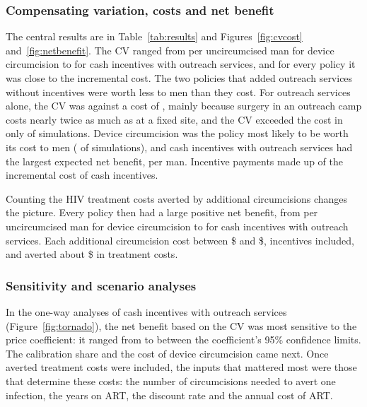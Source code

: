 \documentclass[11pt]{article}
\numberwithin{equation}{section}\numberwithin{figure}{section}\numberwithin{table}{section}
\begin{document}
\begin{table}[!htbp]
\centering
\caption{Predicted choice probabilities and uptake of MMC, by policy (conditional logit).}\label{tab:shares}
\small
{}
\end{table}

\subsubsection{Compensating variation, costs and net benefit}
The central results are in Table~\ref{tab:results} and Figures~\ref{fig:cvcost} and~\ref{fig:netbenefit}. The CV ranged from \mmcPTwoCV{} per uncircumcised man for device circumcision to \mmcPFiveCV{} for cash incentives with outreach services, and for every policy it was close to the incremental cost. The two policies that added outreach services without incentives were worth less to men than they cost. For outreach services alone, the CV was \mmcPOneCV{} against a cost of \mmcPOneCost, mainly because surgery in an outreach camp costs nearly twice as much as at a fixed site, and the CV exceeded the cost in only \mmcPOneNBcvP{} of simulations. Device circumcision was the policy most likely to be worth its cost to men (\mmcPTwoNBcvP{} of simulations), and cash incentives with outreach services had the largest expected net benefit, \mmcPFiveNBcv{} per man. Incentive payments made up \mmcPFourTransfers{} of the \mmcPFourCost{} incremental cost of cash incentives.

Counting the HIV treatment costs averted by additional circumcisions changes the picture. Every policy then had a large positive net benefit, from \mmcPTwoNBtotal{} per uncircumcised man for device circumcision to \mmcPFiveNBtotal{} for cash incentives with outreach services. Each additional circumcision cost between \$\mmccostPerMMCmin{} and \$\mmccostPerMMCmax, incentives included, and averted about \$\mmctxPerMMC{} in treatment costs.

\begin{table}[!htbp]
\centering
\caption{Uptake, compensating variation, incremental cost and net benefit per uncircumcised man (conditional logit, 2017 US\$). 95\% Krinsky-Robb intervals in brackets.}\label{tab:results}
\small
{}
\end{table}

\subsubsection{Sensitivity and scenario analyses}
In the one-way analyses of cash incentives with outreach services (Figure~\ref{fig:tornado}), the net benefit based on the CV was most sensitive to the price coefficient: it ranged from \mmcOWcvTopOneLo{} to \mmcOWcvTopOneHi{} between the coefficient's 95\% confidence limits. The calibration share and the cost of device circumcision came next. Once averted treatment costs were included, the inputs that mattered most were those that determine these costs: the number of circumcisions needed to avert one infection, the years on ART, the discount rate and the annual cost of ART.
\end{document}
